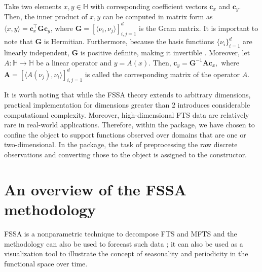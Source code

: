 Take  two elements $x, y\in \mathbb{H}$ with corresponding coefficient vectors ${\pmb c}_x$ and ${\pmb c}_y.$ Then, the inner product of $x, y$ can be computed in matrix form as $\langle x,y \rangle={\pmb c}_x^\top \mathbf{G} {\pmb c}_y$, where $\mathbf{G}=[ \langle \nu_i,\nu_j \rangle ]_{i,j=1}^{d}$ is the Gram matrix.
It is important to note that $\mathbf{G}$ is Hermitian. Furthermore, because the basis functions $\{\nu_i\}_{i=1}^d$ are linearly independent, $\mathbf{G}$ is positive definite, making it invertible \citep[][Thm. 7.2.10]{horn2012matrix}.
Moreover, let $A:\mathbb{H}\rightarrow \mathbb{H}$ be a linear operator and $y=A(x).$ Then, ${\pmb c}_y= \mathbf{G}^{-1}\mathbf{A}{\pmb c}_x,$ where $\mathbf{A}=[ \langle A(\nu_j),\nu_i \rangle ]_{i,j=1}^{d}$ is called the corresponding matrix of the operator $A.$ 

It is worth noting that while the FSSA theory extends to arbitrary dimensions, practical implementation for dimensions greater than $2$ introduces considerable computational complexity. Moreover, high-dimensional FTS data are relatively rare in real-world applications. Therefore, within the  package, we have chosen to confine the  object to support functions observed over domains that are one or two-dimensional. In the  package, the task of preprocessing the raw discrete observations and converting those to the  object is assigned to the  constructor. 

\section{An overview of the FSSA methodology}\label{sec:methodology}
FSSA is a nonparametric technique to decompose FTS and MFTS and the methodology can also be used to forecast such data \citep{haghbin2021, trinka2022multivariate, trinka2023functional}; it can also be used as a visualization tool to illustrate the concept of seasonality and periodicity in the functional space over time.


